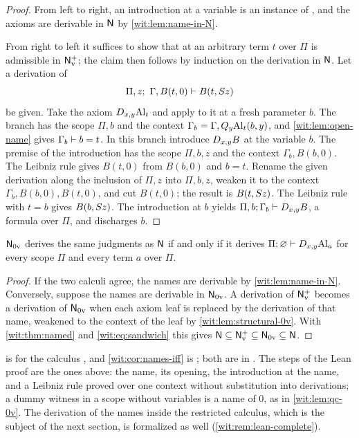 \begin{proof}
From left to right, an introduction at a variable is an instance of
, and the axioms are derivable in $\mathsf{N}$ by
\cref{wit:lem:name-in-N}.

From right to left it suffices to show that  at an arbitrary
term $t$ over $\Pi$ is admissible in $\mathsf{N}_{\mathrm v}^{+}$; the claim then
follows by induction on the derivation in $\mathsf{N}$.  Let a derivation of
\[
 \Pi,z;\ \Gamma,B(t,0)\vdash B(t,S z)
\]
be given.  Take the axiom $D_{x,y}\mathrm{Al}_t$ and apply  to
it at a fresh parameter $b$.  The branch has the scope $\Pi,b$ and the
context $\Gamma_b=\Gamma,Q_{y}\mathrm{Al}_t(b,y)$, and
\cref{wit:lem:open-name} gives $\Gamma_b\vdash b=t$.  In this branch
introduce $D_{x,y}B$ at the variable $b$.  The premise of the introduction
has the scope $\Pi,b,z$ and the context $\Gamma_b,B(b,0)$.  The Leibniz rule
gives $B(t,0)$ from $B(b,0)$ and $b=t$.  Rename the given derivation along
the inclusion of $\Pi,z$ into $\Pi,b,z$, weaken it to the context
$\Gamma_b,B(b,0),B(t,0)$, and cut $B(t,0)$; the result is $B(t,S z)$.
The Leibniz rule with $t=b$ gives $B(b,S z)$.  The introduction at $b$
yields $\Pi,b;\Gamma_b\vdash D_{x,y}B$, a formula over $\Pi$, and
 discharges $b$.
\end{proof}

\begin{corollary}
\label{wit:cor:names-iff}
$\mathsf{N}_{0\mathrm v}$ derives the same judgments as $\mathsf{N}$ if and only if it
derives $\Pi;\varnothing\vdash D_{x,y}\mathrm{Al}_a$ for every scope $\Pi$
and every term $a$ over $\Pi$.
\end{corollary}

\begin{proof}
If the two calculi agree, the names are derivable by
\cref{wit:lem:name-in-N}.  Conversely, suppose the names are derivable in
$\mathsf{N}_{0\mathrm v}$.  A derivation of $\mathsf{N}_{\mathrm v}^{+}$ becomes a
derivation of $\mathsf{N}_{0\mathrm v}$ when each axiom leaf is replaced by the
derivation of that name, weakened to the context of the leaf by
\cref{wit:lem:structural-0v}.  With \cref{wit:thm:named} and
\eqref{wit:eq:sandwich} this gives
$\mathsf{N}\subseteq\mathsf{N}_{\mathrm v}^{+}\subseteq\mathsf{N}_{0\mathrm v}\subseteq\mathsf{N}$.
\end{proof}

\begin{remark}
\label{wit:rem:lean-names}
 is  for the calculus
, and \cref{wit:cor:names-iff} is
; both are in .
The steps of the Lean proof are the ones above: the name, its opening, the
introduction at the name, and a Leibniz rule proved over one context without
substitution into derivations; a dummy witness in a scope without variables
is a name of $0$, as in \cref{wit:lem:qc-0v}.  The derivation of the names
inside the restricted calculus, which is the subject of the next section, is
formalized as well (\cref{wit:rem:lean-complete}).
\end{remark}

